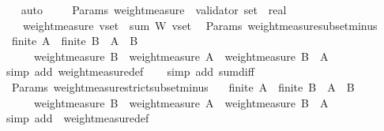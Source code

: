 \begin{isabellebody}
\ \ \isamarkupfalse%
\ auto%
\endisatagproof
{\isafoldproof}%
%
\isadelimproof
\isanewline
%
\endisadelimproof
\ \ \isanewline
\isanewline
\isanewline
\isanewline
\isanewline
\isanewline
{}\isamarkupfalse%
\ {\isacharparenleft}\ Params{\isacharparenright}\ weight{\isacharunderscore}measure\ {\isacharcolon}{\isacharcolon}\ {\isachardoublequoteopen}validator\ set\ {\isasymRightarrow}\ real{\isachardoublequoteclose}\isanewline
\ \ \isanewline
\ \ \ \ \isanewline
\ \ \ \ {\isachardoublequoteopen}weight{\isacharunderscore}measure\ v{\isacharunderscore}set\ {\isacharequal}\ sum\ W\ v{\isacharunderscore}set{\isachardoublequoteclose}\isanewline
\isanewline
{}\isamarkupfalse%
\ {\isacharparenleft}\ Params{\isacharparenright}\ weight{\isacharunderscore}measure{\isacharunderscore}subset{\isacharunderscore}minus\ {\isacharcolon}\isanewline
\ \ {\isachardoublequoteopen}finite\ A\ {\isasymLongrightarrow}\ finite\ B\ {\isasymLongrightarrow}\ A\ {\isasymsubseteq}\ B\isanewline
\ \ \ \ {\isasymLongrightarrow}\ \ weight{\isacharunderscore}measure\ B\ {\isacharminus}\ weight{\isacharunderscore}measure\ A\ {\isacharequal}\ weight{\isacharunderscore}measure\ {\isacharparenleft}B\ {\isacharminus}\ A{\isacharparenright}{\isachardoublequoteclose}\isanewline
%
\isadelimproof
\ \ %
\endisadelimproof
%
\isatagproof
{}\isamarkupfalse%
\ {\isacharparenleft}simp\ add{\isacharcolon}\ weight{\isacharunderscore}measure{\isacharunderscore}def{\isacharparenright}\isanewline
\ \ \isamarkupfalse%
\ {\isacharparenleft}simp\ add{\isacharcolon}\ sum{\isacharunderscore}diff{\isacharparenright}%
\endisatagproof
{\isafoldproof}%
%
\isadelimproof
\isanewline
%
\endisadelimproof
\isanewline
{}\isamarkupfalse%
\ {\isacharparenleft}\ Params{\isacharparenright}\ weight{\isacharunderscore}measure{\isacharunderscore}strict{\isacharunderscore}subset{\isacharunderscore}minus\ {\isacharcolon}\isanewline
\ \ {\isachardoublequoteopen}finite\ A\ {\isasymLongrightarrow}\ finite\ B\ {\isasymLongrightarrow}\ A\ {\isasymsubset}\ B\isanewline
\ \ \ \ {\isasymLongrightarrow}\ \ weight{\isacharunderscore}measure\ B\ {\isacharminus}\ weight{\isacharunderscore}measure\ A\ {\isacharequal}\ weight{\isacharunderscore}measure\ {\isacharparenleft}B\ {\isacharminus}\ A{\isacharparenright}{\isachardoublequoteclose}\isanewline
%
\isadelimproof
\ \ %
\endisadelimproof
%
\isatagproof
{}\isamarkupfalse%
\ {\isacharparenleft}simp\ add{\isacharcolon}\ \ weight{\isacharunderscore}measure{\isacharunderscore}def{\isacharparenright}\isanewline

\end{isabellebody}
